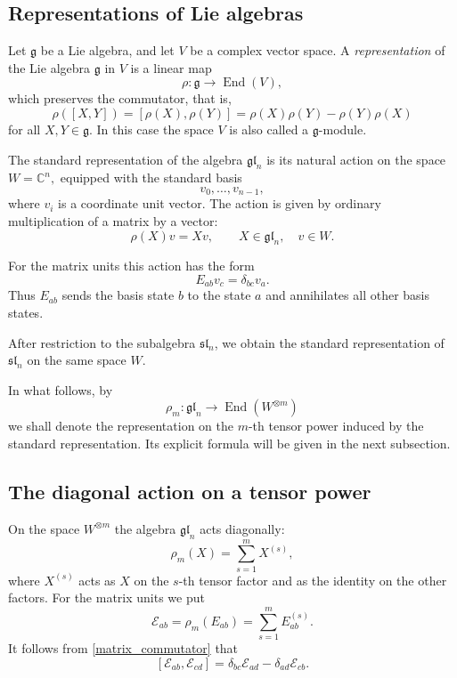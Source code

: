 \documentclass[12pt,reqno]{amsart}
\newcommand{\End}{\operatorname{End}}
\begin{document}
\subsection{Representations of Lie algebras}

Let $\mathfrak g$ be a Lie algebra, and let $V$ be a complex vector
space. A \emph{representation} of the Lie algebra $\mathfrak g$ in $V$ is
a linear map
$$
\rho:\mathfrak g\longrightarrow \End(V),
$$
which preserves the commutator, that is,
$$
\rho([X,Y])
=
[\rho(X),\rho(Y)]
=
\rho(X)\rho(Y)-\rho(Y)\rho(X)
$$
for all $X,Y\in\mathfrak g$. In this case the space $V$ is also called a
$\mathfrak g$-module.

The standard representation of the algebra $\mathfrak{gl}_n$ is its
natural action on the space
$
W=\mathbb C^n,
$
equipped with the standard basis $$ v_0,\dots,v_{n-1}, $$ where $v_i$ is
a coordinate unit vector.
The action is given by ordinary multiplication of a matrix by a vector:
$$
\rho(X)v=Xv,
\qquad
X\in\mathfrak{gl}_n,\quad v\in W.
$$

For the matrix units this action has the form
$$
E_{ab}v_c=\delta_{bc}v_a.
$$
Thus $E_{ab}$ sends the basis state $b$ to the state $a$ and annihilates
all other basis states.

After restriction to the subalgebra $\mathfrak{sl}_n$, we obtain the
standard representation of $\mathfrak{sl}_n$ on the same space $W$.

In what follows, by
$$
\rho_m:\mathfrak{gl}_n\longrightarrow
\End(W^{\otimes m})
$$
we shall denote the representation on the $m$-th tensor power induced by
the standard representation. Its explicit formula will be given in the
next subsection.


\subsection{The diagonal action on a tensor power}

On the space $W^{\otimes m}$ the algebra $\mathfrak{gl}_n$ acts
diagonally:
$$
\rho_m(X)
=
\sum_{s=1}^m X^{(s)},
$$
where $X^{(s)}$ acts as $X$ on the $s$-th tensor factor and as the
identity on the other factors. For the matrix units we put
$$
\mathcal E_{ab}
=
\rho_m(E_{ab})
=
\sum_{s=1}^m E_{ab}^{(s)}.
$$
It follows from \eqref{matrix_commutator} that
\begin{equation}\label{tensor_commutator}
[\mathcal E_{ab},\mathcal E_{cd}]
=
\delta_{bc}\mathcal E_{ad}-\delta_{ad}\mathcal E_{cb}.
\end{equation}
\end{document}
